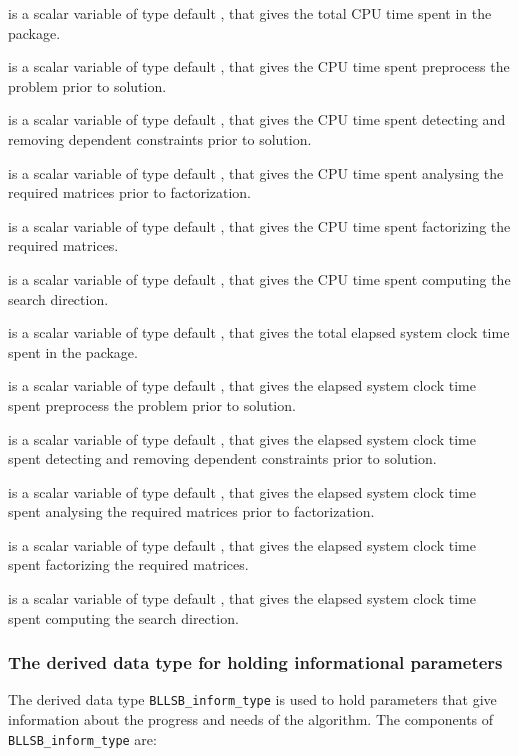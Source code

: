 \documentclass{galahad}
\newcommand{\packagename}{BLLSB}
\begin{document}
\begin{description}
 is a scalar variable of type default \realdp, that gives
 the total CPU time spent in the package.

 is a scalar variable of type default \realdp, that gives
 the CPU time spent preprocess the problem prior to solution.

 is a scalar variable of type default \realdp, that gives
 the CPU time spent detecting and removing dependent constraints prior
to solution.

 is a scalar variable of type default \realdp, that gives
 the CPU time spent analysing the required matrices prior to factorization.

 is a scalar variable of type default \realdp, that gives
 the CPU time spent factorizing the required matrices.

 is a scalar variable of type default \realdp, that gives
 the CPU time spent computing the search direction.

 is a scalar variable of type default \realdp, that gives
 the total elapsed system clock time spent in the package.

 is a scalar variable of type default \realdp, that gives
 the elapsed system clock time spent preprocess the problem prior to solution.

 is a scalar variable of type default \realdp,
that gives  the elapsed system clock time spent detecting and removing
dependent constraints prior to solution.

 is a scalar variable of type default \realdp, that gives
 the elapsed system clock time spent analysing the required matrices prior to
factorization.

 is a scalar variable of type default \realdp, that gives
 the elapsed system clock time spent factorizing the required matrices.

 is a scalar variable of type default \realdp, that gives
 the elapsed system clock time spent computing the search direction.

\end{description}


\subsubsection{The derived data type for holding informational
 parameters}\label{typeinform}
The derived data type
{\tt \packagename\_inform\_type}
is used to hold parameters that give information about the progress and needs
of the algorithm. The components of
{\tt \packagename\_inform\_type}
are:
\end{document}
